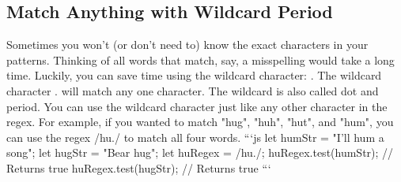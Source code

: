 \documentclass{article}%
\begin{document}
%
\subsection{Match Anything with Wildcard Period}%
\label{subsec:MatchAnythingwithWildcardPeriod}%
Sometimes you won't (or don't need to) know the exact characters in your patterns. Thinking of all words that match, say, a misspelling would take a long time. Luckily, you can save time using the wildcard character: .\newline%
The wildcard character . will match any one character. The wildcard is also called dot and period. You can use the wildcard character just like any other character in the regex. For example, if you wanted to match "hug", "huh", "hut", and "hum", you can use the regex /hu./ to match all four words.\newline%
```js\newline%
let humStr = "I'll hum a song";\newline%
let hugStr = "Bear hug";\newline%
let huRegex = /hu./;\newline%
huRegex.test(humStr); // Returns true\newline%
huRegex.test(hugStr); // Returns true\newline%
```\newline%

%
\end{document}
